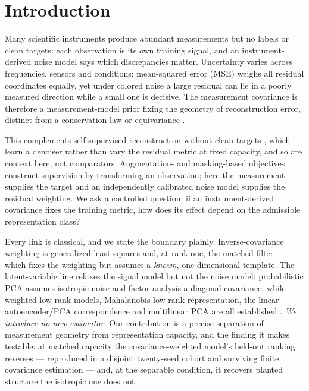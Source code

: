 \section{Introduction}

Many scientific instruments produce abundant measurements but no labels or clean targets: each observation is its own training signal, and an instrument-derived noise model says which discrepancies matter. Uncertainty varies across frequencies, sensors and conditions; mean-squared error (MSE) weighs all residual coordinates equally, yet under colored noise a large residual can lie in a poorly measured direction while a small one is decisive. The measurement covariance is therefore a measurement-model prior fixing the geometry of reconstruction error, distinct from a conservation law or equivariance \citep{bronstein2021geometric,karniadakis2021physics}.

This complements self-supervised reconstruction without clean targets \citep{batson2019noise2self,yaman2020ssdu,gruber2025noisier2inverse}, which learn a denoiser rather than vary the residual metric at fixed capacity, and so are context here, not comparators. Augmentation- and masking-based objectives \citep{chen2020simclr,he2022masked} construct supervision by transforming an observation; here the measurement supplies the target and an independently calibrated noise model supplies the residual weighting. We ask a controlled question: if an instrument-derived covariance fixes the training metric, how does its effect depend on the admissible representation class?

Every link is classical, and we state the boundary plainly. Inverse-covariance weighting is generalized least squares \citep{aitken1936least} and, at rank one, the matched filter \citep{turin1960introduction,kay1993fundamentals,szymkowiak1993signal} --- which fixes the weighting but assumes a \emph{known}, one-dimensional template. The latent-variable line relaxes the signal model but not the noise model: probabilistic PCA assumes isotropic noise and factor analysis a diagonal covariance, while weighted low-rank models, Mahalanobis low-rank representation, the linear-autoencoder/PCA correspondence and multilinear PCA are all established \citep{tipping1999probabilistic,rubin1982algorithms,roweis1998algorithms,bailey2012principal,allen2014gls,zhang2019matrixnormal,baldi1989neural,lu2008mpca}. \emph{We introduce no new estimator.} Our contribution is a precise separation of measurement geometry from representation capacity, and the finding it makes testable: at matched capacity the covariance-weighted model's held-out ranking reverses --- reproduced in a disjoint twenty-seed cohort and surviving finite covariance estimation --- and, at the separable condition, it recovers planted structure the isotropic one does not.

